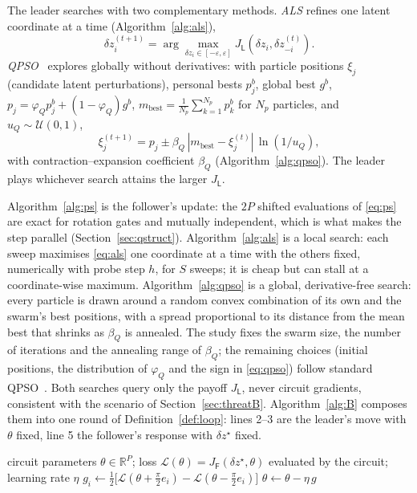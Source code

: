 \documentclass[conference]{IEEEtran}
\newcommand{\cL}{\mathcal{L}}
\begin{document}
The leader searches with two complementary methods. \emph{ALS} refines one latent coordinate at a time (Algorithm~\ref{alg:als}),
\begin{equation}
\delta z^{(t+1)}_i=\arg\max_{\delta z_i\in[-\varepsilon,\varepsilon]}J_{\mathsf L}(\delta z_i,\delta z^{(t)}_{-i}).
\label{eq:als}
\end{equation} \emph{QPSO}~\cite{sun2004} explores globally without derivatives: with particle positions $\xi_j$ (candidate latent perturbations), personal bests $p^b_j$, global best $g^b$, $p_j=\varphi_Q p^b_j+(1-\varphi_Q)g^b$, $m_{\mathrm{best}}=\frac1{N_p}\sum_{k=1}^{N_p} p^b_k$ for $N_p$ particles, and $u_Q\sim\mathcal U(0,1)$,
\begin{equation}
\xi^{(t+1)}_j=p_j\pm\beta_{Q}\,|m_{\mathrm{best}}-\xi^{(t)}_j|\,\ln(1/u_Q),
\label{eq:qpso}
\end{equation}
with contraction--expansion coefficient $\beta_Q$ (Algorithm~\ref{alg:qpso}). The leader plays whichever search attains the larger $J_{\mathsf L}$.

Algorithm~\ref{alg:ps} is the follower's update: the $2P$ shifted evaluations of \eqref{eq:ps} are exact for rotation gates and mutually independent, which is what makes the step parallel (Section~\ref{sec:qstruct}). Algorithm~\ref{alg:als} is a local search: each sweep maximises \eqref{eq:als} one coordinate at a time with the others fixed, numerically with probe step $h$, for $S$ sweeps; it is cheap but can stall at a coordinate-wise maximum. Algorithm~\ref{alg:qpso} is a global, derivative-free search: every particle is drawn around a random convex combination of its own and the swarm's best positions, with a spread proportional to its distance from the mean best that shrinks as $\beta_Q$ is annealed. The study fixes the swarm size, the number of iterations and the annealing range of $\beta_Q$; the remaining choices (initial positions, the distribution of $\varphi_Q$ and the sign in \eqref{eq:qpso}) follow standard QPSO~\cite{sun2004}. Both searches query only the payoff $J_{\mathsf L}$, never circuit gradients, consistent with the scenario of Section~\ref{sec:threatB}. Algorithm~\ref{alg:B} composes them into one round of Definition~\ref{def:loop}: lines 2--3 are the leader's move with $\theta$ fixed, line 5 the follower's response with $\delta z^\star$ fixed.

\begin{algorithm}[t]
\caption{Follower update by the parameter-shift rule (Study~B)}\label{alg:ps}
\small
\begin{algorithmic}[1]
\Require circuit parameters $\theta\in\mathbb R^P$; loss $\cL(\theta)=J_{\mathsf F}(\delta z^\star,\theta)$ evaluated by the circuit; learning rate $\eta$
 
  \State $g_i\gets\tfrac12\big[\cL(\theta+\tfrac{\pi}{2}e_i)-\cL(\theta-\tfrac{\pi}{2}e_i)\big]$ 
\EndFor
\State $\theta\gets\theta-\eta\,g$
\end{algorithmic}
\end{algorithm}
\end{document}
